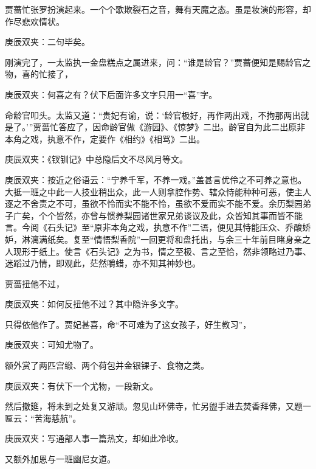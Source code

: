 \begin{parag}
    贾蔷忙张罗扮演起来。一个个歌欺裂石之音，舞有天魔之态。虽是妆演的形容，却作尽悲欢情状。\begin{note}庚辰双夹：二句毕矣。\end{note}刚演完了，一太监执一金盘糕点之属进来，问：“谁是龄官？”贾蔷便知是赐龄官之物，喜的忙接了，\begin{note}庚辰双夹：何喜之有？伏下后面许多文字只用一“喜”字。\end{note}命龄官叩头。太监又道：“贵妃有谕，说：‘龄官极好，再作两出戏，不拘那两出就是了。’”贾蔷忙答应了，因命龄官做《游园》、《惊梦》二出。龄官自为此二出原非本角之戏，执意不作，定要作《相约》《相骂》二出。\begin{note}庚辰双夹：《钗钏记》中总隐后文不尽风月等文。\end{note}\begin{note}庚辰双夹：按近之俗语云：“宁养千军，不养一戏。”盖甚言优伶之不可养之意也。大抵一班之中此一人技业稍出众，此一人则拿腔作势、辖众恃能种种可恶，使主人逐之不舍责之不可，虽欲不怜而实不能不怜，虽欲不爱而实不能不爱。余历梨园弟子广矣，个个皆然，亦曾与惯养梨园诸世家兄弟谈议及此，众皆知其事而皆不能言。今阅《石头记》至“原非本角之戏，执意不作”二语，便见其恃能压众、乔酸娇妒，淋漓满纸矣。复至“情悟梨香院”一回更将和盘托出，与余三十年前目睹身亲之人现形于纸上。使言《石头记》之为书，情之至极、言之至恰，然非领略过乃事、迷蹈过乃情，即观此，茫然嚼蜡，亦不知其神妙也。\end{note}贾蔷扭他不过，\begin{note}庚辰双夹：如何反扭他不过？其中隐许多文字。\end{note}只得依他作了。贾妃甚喜，命“不可难为了这女孩子，好生教习”，\begin{note}庚辰双夹：可知尤物了。\end{note}额外赏了两匹宫缎、两个荷包并金银锞子、食物之类。\begin{note}庚辰双夹：有伏下一个尤物，一段新文。\end{note}然后撤筵，将未到之处复又游顽。忽见山环佛寺，忙另盥手进去焚香拜佛，又题一匾云：“苦海慈航”。\begin{note}庚辰双夹：写通部人事一篇热文，却如此冷收。\end{note}又额外加恩与一班幽尼女道。
\end{parag}


